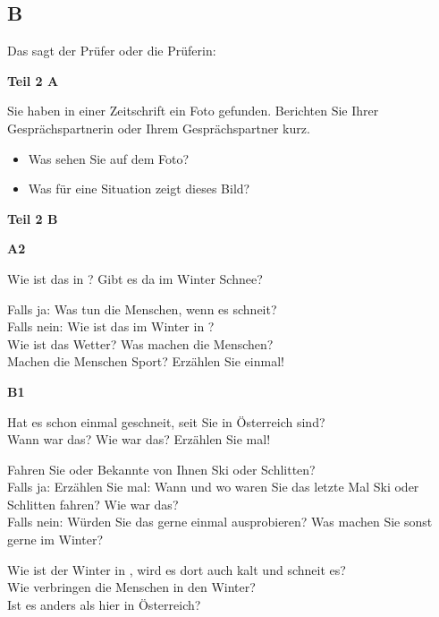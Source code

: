 \documentclass[a4paper]{article}
\begin{document}
        \subsection{B}
            Das sagt der Prüfer oder die Prüferin:
            
            \medskip
            \textbf{Teil 2 A}
            
            Sie haben in einer Zeitschrift ein Foto gefunden. Berichten Sie Ihrer Gesprächspartnerin oder Ihrem Gesprächspartner kurz.
            
            \begin{itemize}
                \item Was sehen Sie auf dem Foto?
                \item Was für eine Situation zeigt dieses Bild?
            \end{itemize}
            
            \textbf{Teil 2 B}
            
            \textbf{A2}
            
            Wie ist das in \underline{\hspace{2cm}}? Gibt es da im Winter Schnee?
            
            Falls ja: Was tun die Menschen, wenn es schneit?\\
            Falls nein: Wie ist das im Winter in \underline{\hspace{2cm}}?\\
            Wie ist das Wetter? Was machen die Menschen?\\
            Machen die Menschen Sport? Erzählen Sie einmal!
            
            \medskip
            \textbf{B1}
            
            Hat es schon einmal geschneit, seit Sie in Österreich sind?\\
            Wann war das? Wie war das? Erzählen Sie mal!
            
            Fahren Sie oder Bekannte von Ihnen Ski oder Schlitten?\\
            Falls ja: Erzählen Sie mal: Wann und wo waren Sie das letzte Mal Ski oder Schlitten fahren? Wie war das?\\
            Falls nein: Würden Sie das gerne einmal ausprobieren? Was machen Sie sonst gerne im Winter?
            
            Wie ist der Winter in \underline{\hspace{2cm}}, wird es dort auch kalt und schneit es?\\
            Wie verbringen die Menschen in \underline{\hspace{2cm}} den Winter?\\
            Ist es anders als hier in Österreich?
            
\end{document}
